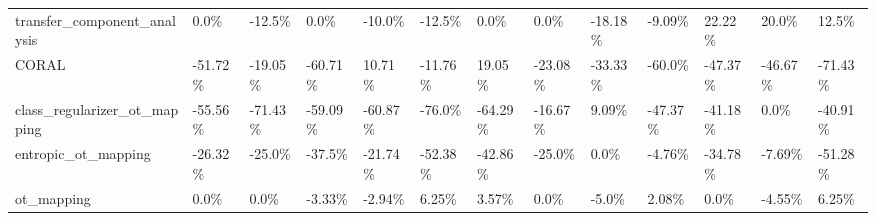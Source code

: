 \begin{tabular}{lllllllllllll}
 transfer\_component\_analysis  & 0.0\%                    & -12.5\%               & 0.0\%                   & -10.0\%                  & -12.5\%                & 0.0\%                    & 0.0\%                 & -18.18\%               & -9.09\%               & 22.22\%                 & 20.0\%                   & 12.5\%                \\
 CORAL                        & -51.72\%                 & -19.05\%              & -60.71\%                & 10.71\%                  & -11.76\%               & 19.05\%                  & -23.08\%              & -33.33\%               & -60.0\%               & -47.37\%                & -46.67\%                 & -71.43\%              \\
 class\_regularizer\_ot\_mapping & -55.56\%                 & -71.43\%              & -59.09\%                & -60.87\%                 & -76.0\%                & -64.29\%                 & -16.67\%              & 9.09\%                 & -47.37\%              & -41.18\%                & 0.0\%                    & -40.91\%              \\
 entropic\_ot\_mapping          & -26.32\%                 & -25.0\%               & -37.5\%                 & -21.74\%                 & -52.38\%               & -42.86\%                 & -25.0\%               & 0.0\%                  & -4.76\%               & -34.78\%                & -7.69\%                  & -51.28\%              \\
 ot\_mapping                   & 0.0\%                    & 0.0\%                 & -3.33\%                 & -2.94\%                  & 6.25\%                 & 3.57\%                   & 0.0\%                 & -5.0\%                 & 2.08\%                & 0.0\%                   & -4.55\%                  & 6.25\%                \\
\hline
\end{tabular}